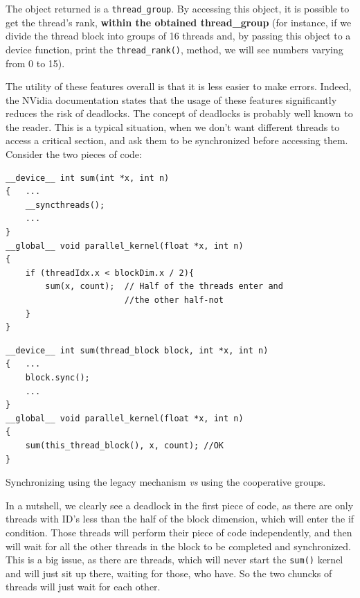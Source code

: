 \documentclass[12pt]{article}
\begin{document}
The object returned is a \verb|thread_group|. By accessing this object, it is possible to get 
the thread's rank, \textbf{within the obtained thread\_group} (for instance, if we divide 
the thread block into groups of 16 threads and, by passing this object to a device function,
print the \verb|thread_rank()|, method, we will see numbers varying from 0 to 15). 

The utility of these features overall is that it is less easier to make errors. Indeed, 
the NVidia documentation states that the usage of these features significantly reduces the 
risk of deadlocks. The concept of deadlocks is probably well known to the reader. This is 
a typical situation, when we don't want different threads to access a critical section, and 
ask them to be synchronized before accessing them. Consider the two pieces of code:

\begin{listing}[!ht]
\begin{verbatim}
__device__ int sum(int *x, int n) 
{   ...
    __syncthreads();
    ...
}
__global__ void parallel_kernel(float *x, int n)
{
    if (threadIdx.x < blockDim.x / 2){
        sum(x, count);  // Half of the threads enter and 
                        //the other half-not
    }                   
}
\end{verbatim}
\caption*{}
\label{deadlock}

\begin{verbatim}
__device__ int sum(thread_block block, int *x, int n) 
{   ...
    block.sync();
    ...
}
__global__ void parallel_kernel(float *x, int n)
{
    sum(this_thread_block(), x, count); //OK
}
\end{verbatim}
    \caption{Synchronizing using the legacy mechanism \textit{vs} using the cooperative groups. \cite{blog_2020}}
\label{nodeadlock}
\end{listing}

\newpage
In a nutshell, we clearly see a deadlock in the first piece of code, as 
there are only threads with ID's less than the half of the block dimension, which will 
enter the if condition. Those threads will perform their piece of code independently, 
and then will wait for all the other threads in the block to be completed and 
synchronized. This is a big issue, as there are threads, which will never start the \verb|sum()|
kernel and will just sit up there, waiting for those, who have. So the two chuncks of threads
will just wait for each other. 
\end{document}
